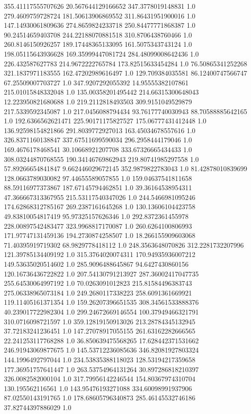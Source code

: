 355.41117555707626	20.567644129166652	347.3778019148831	1.0
279.4609759728724	181.50613906869552	311.86431951900016	1.0
147.14930061809636	274.8659824233718	250.84477771868387	1.0
90.24514659403708	244.22188070881518	310.8706438760466	1.0
260.8146150926257	189.17448365133095	161.5075343743124	1.0
198.05115643936628	169.35999447081724	284.48099008642436	1.0
226.432587627783	214.9672222765784	173.82515633454284	1.0
76.50865341252268	321.1837971183555	162.47202989616497	1.0
129.709384035581	86.12400747566747	67.25509007703727	1.0
347.9207292055392	14.95555382107861	215.01015848332048	1.0
135.00358201495442	214.66315300648043	12.223950821680688	1.0
219.2112818493503	309.9151049529879	217.5339592345087	1.0
217.0456088794434	93.76177740030943	88.70588885642165	1.0
192.6366562621471	225.90171175827527	175.06777431412448	1.0
136.92598154821866	291.8039772927013	163.45034678557616	1.0
326.8371160138847	337.67511699590034	296.2958444179046	1.0
169.4676178468541	30.10668921207708	333.67326665434433	1.0
308.03244870768555	190.34146769862943	219.80741985297558	1.0
57.89266654841847	9.662446029672145	352.9879822783043	1.0
81.42878010839699	128.0663789030082	97.44655589057855	1.0
159.04637541811658	88.59116977373867	187.67145794462851	1.0
39.36164538954311	47.366667313367955	215.53117540347026	1.0
244.5466981095246	174.62868312785167	269.2387161645268	1.0
130.13606104423758	49.83810054817419	95.97325157626346	1.0
292.8372361455978	228.00897542483477	323.9968817170087	1.0
260.6264100806993	171.97747131459136	194.2730874258507	1.0
18.266155909603068	71.40395919719302	68.9829778418112	1.0
248.3563648070826	312.2281732207996	121.39785134409192	1.0
315.3764020074311	170.94935936007212	149.53635020514602	1.0
285.9096488645867	94.6427430860156	120.16736436722822	1.0
207.54130791213927	287.36002417047735	255.64530064997192	1.0
70.0263091012823	215.81584496383743	275.06338965073184	1.0
249.2680117338223	258.6091361669921	119.11405161371354	1.0
159.26207396651535	308.34561533888376	40.239017722982304	1.0
299.24672669146554	100.37949466321791	310.0716098721597	1.0
359.12819150913026	213.28784345132945	37.72183241236451	1.0
147.27078917055155	261.63162282666565	22.241253117768288	1.0
36.850639475568265	17.628442371531662	246.91943069877675	1.0
145.53712236085636	346.82081927803324	144.1996492797044	1.0
234.53835388118023	128.53194217359658	177.36951757641447	1.0
263.53754964131264	30.897286818210397	326.0082582000104	1.0
317.79956142246544	154.80367974310704	130.195562116561	1.0
143.95476193271088	334.60098991937906	87.02550143191765	1.0
178.68605796340873	285.46145532746186	37.82744397886029	1.0
